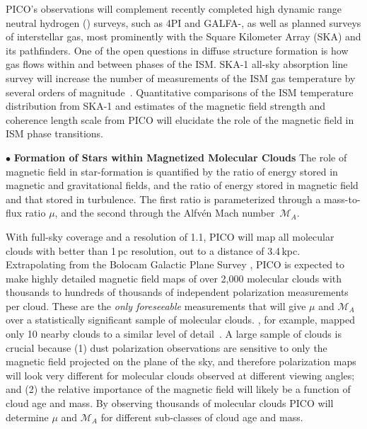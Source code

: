 \documentclass[PICOReport.tex]{subfiles}
\begin{document}
PICO's observations will complement recently completed high dynamic range neutral hydrogen (\HI) surveys, such as \HI4PI \citep{HI4PI:2016} and GALFA-\hi \citep{Peek:2018}, as well as planned surveys of interstellar gas, most prominently with the Square Kilometer Array (SKA) and its pathfinders. One of the open questions in diffuse structure formation is how gas flows within and between phases of the \ac{ISM}.  SKA-1 all-sky absorption line survey will increase the number of measurements of the \ac{ISM} gas temperature by several orders of magnitude~\citep{McClure-Griffiths2015}. Quantitative comparisons of the \ac{ISM} temperature distribution from SKA-1 and estimates of the magnetic field strength and coherence length scale from PICO will elucidate the role of the magnetic field in \ac{ISM} phase transitions.

\noindent$\bullet$ {\bf Formation of Stars within Magnetized Molecular Clouds} \hspace{0.1in}
The role of magnetic field in star-formation is quantified by the ratio of energy stored in magnetic and gravitational fields, and the ratio of energy stored in magnetic field and that stored in turbulence. The first ratio is parameterized through a mass-to-flux ratio $\mu$, and the second
through the Alfv\'{e}n Mach number~$\mathcal{M}_A$. 

With full-sky coverage and a resolution of 1.1\arcmin, PICO will map all molecular clouds with better than 1\,pc resolution, out to a distance of 3.4\,kpc.  Extrapolating from the Bolocam Galactic Plane Survey \citep[BGPS,][]{EllsworthBowers2015}, PICO is expected to make highly detailed magnetic field maps of over 2,000 molecular clouds with thousands to hundreds of thousands of independent polarization measurements per cloud. These are the {\it only foreseeable} measurements that will give $\mu$ and $\mathcal{M}_A$ over a statistically significant sample of molecular clouds. \planck , for example, mapped only 10 nearby clouds to a similar level of detail~\citep{Planck:XXXV}. A large sample of clouds is crucial because (1) dust polarization observations are sensitive to only the magnetic field projected on the plane of the sky, and therefore polarization maps will look very different for molecular clouds observed at different viewing angles; and (2) the relative importance of the magnetic field will likely be a function of cloud age and mass. By observing thousands of molecular clouds PICO will determine $\mu$ and  $\mathcal{M}_A$ for different sub-classes of cloud age and mass. 
\end{document}
